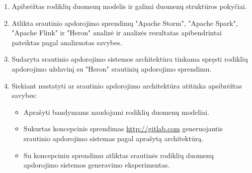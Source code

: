 \documentclass{VUMIFPSbakalaurinis}
\begin{document}
\begin{enumerate}
    \item Apibrėžtas rodiklių duomenų modelis ir galimi duomenų struktūros pokyčiai.
    \item Atlikta srautinio apdorojimo sprendimų "Apache Storm", "Apache Spark", "Apache Flink" ir "Heron" analizė ir analizės rezultatas apibendrintai pateiktas pagal analizuotas savybes. 
    \item Sudaryta srautinio apdorojimo sistemos architektūra tinkama spręsti rodiklių apdorojimo uždavinį su "Heron" srautinių apdorojimo sprendimu. 
    \item Siekiant nustatyti ar srautinio apdorojimo architektūra atitinka apsibrėžtas savybes:
    \begin{itemize}
        \item Aprašyti bandymams naudojami rodiklių duomenų modeliai.
        \item Sukurtas koncepcinis sprendimas \url{http://gitlab.com} generuojantis srautinio apdorojimo sistemas pagal aprašytą architektūrą.
        \item Su koncepciniu sprendimu atliktas srautinės rodiklių duomenų apdorojimo sistemos generavimo eksperimentas. 
    \end{itemize} 
\end{enumerate}
\end{document}
